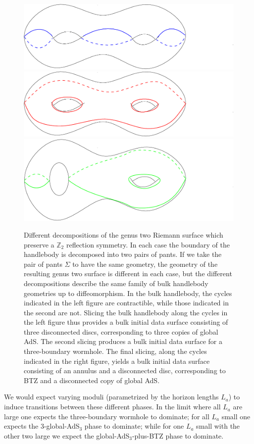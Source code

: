 \documentclass[12pt]{article}
\numberwithin{equation}{section}
\begin{document}
\begin{figure}
\centering
\includegraphics[keepaspectratio,width=0.3\linewidth]{genus2.pdf}
\includegraphics[keepaspectratio,width=0.3\linewidth]{genus2-2.pdf}
\includegraphics[keepaspectratio,width=0.3\linewidth]{genus2-3.pdf}
\caption{Different decompositions of the genus two Riemann surface which preserve a $\mathbb Z_2$ reflection symmetry. In each case the boundary of the handlebody is decomposed into two pairs of pants. If we take the pair of pants $\Sigma$ to have the same geometry, the geometry of the resulting genus two surface is different in each case, but the different decompositions describe the same family of bulk handlebody geometries up to diffeomorphism. In the bulk handlebody, the cycles indicated in the left figure are contractible, while those indicated in the second are not. Slicing the bulk handlebody along the cycles in the left figure thus provides a bulk initial data surface consisting of three disconnected discs, corresponding to three copies of global AdS. The second slicing produces a bulk initial data surface for a three-boundary wormhole. The final slicing, along the cycles indicated in the right figure, yields a bulk initial data surface consisting of an annulus and a disconnected disc, corresponding to BTZ and a disconnected copy of global AdS.}
\label{genus2}
\end{figure}

We would expect varying moduli (parametrized by the horizon lengths $L_a$) to induce transitions between these different phases. In the limit where all $L_a$ are large one expects the three-boundary wormhole to dominate; for all $L_a$ small one expects the 3-global-AdS$_3$ phase to dominate; while  for one $L_a$ small with the other two large we expect the global-AdS$_3$-plus-BTZ phase to dominate.
\end{document}
